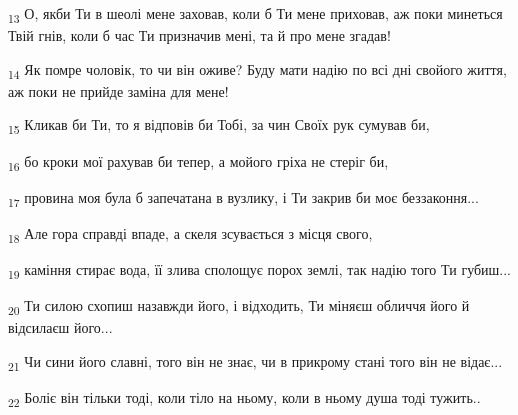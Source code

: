 \begin{tcolorbox}
\textsubscript{13} О, якби Ти в шеолі мене заховав, коли б Ти мене приховав, аж поки минеться Твій гнів, коли б час Ти призначив мені, та й про мене згадав!
\end{tcolorbox}
\begin{tcolorbox}
\textsubscript{14} Як помре чоловік, то чи він оживе? Буду мати надію по всі дні свойого життя, аж поки не прийде заміна для мене!
\end{tcolorbox}
\begin{tcolorbox}
\textsubscript{15} Кликав би Ти, то я відповів би Тобі, за чин Своїх рук сумував би,
\end{tcolorbox}
\begin{tcolorbox}
\textsubscript{16} бо кроки мої рахував би тепер, а мойого гріха не стеріг би,
\end{tcolorbox}
\begin{tcolorbox}
\textsubscript{17} провина моя була б запечатана в вузлику, і Ти закрив би моє беззаконня...
\end{tcolorbox}
\begin{tcolorbox}
\textsubscript{18} Але гора справді впаде, а скеля зсувається з місця свого,
\end{tcolorbox}
\begin{tcolorbox}
\textsubscript{19} каміння стирає вода, її злива сполощує порох землі, так надію того Ти губиш...
\end{tcolorbox}
\begin{tcolorbox}
\textsubscript{20} Ти силою схопиш назавжди його, і відходить, Ти міняєш обличчя його й відсилаєш його...
\end{tcolorbox}
\begin{tcolorbox}
\textsubscript{21} Чи сини його славні, того він не знає, чи в прикрому стані того він не відає...
\end{tcolorbox}
\begin{tcolorbox}
\textsubscript{22} Боліє він тільки тоді, коли тіло на ньому, коли в ньому душа тоді тужить..
\end{tcolorbox}
